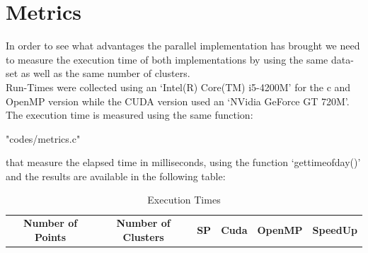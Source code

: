 \documentclass[10pt,twocolumn,letterpaper]{article}
\begin{document}
\section{Metrics}
In order to see what advantages the parallel implementation has brought we need to measure the execution time of both 
implementations by using the same data-set as well as the same number of clusters.\\
Run-Times were collected using an `Intel(R) Core(TM) i5-4200M' for the c and OpenMP version while the CUDA version used an
`NVidia GeForce GT 720M'.\\
The execution time is measured using the same function:\\
\begin{lstinputlisting}[language=C,style=CSnippetStyle,caption=Time Function,firstline=1,lastline=13]{
	"codes/metrics.c"}
\end{lstinputlisting}
that measure the elapsed time in milliseconds, using the function `gettimeofday()' and the results are available in the following table:
\\
\begin{table}[H]
\centering
\begin{tabular}{@{}cccccc@{}}
\textbf{Number of Points} & \textbf{Number of Clusters} & \textbf{SP} & \textbf{Cuda} & \textbf{OpenMP} &  \textbf{SpeedUp} \\
\end{tabular}
\caption{Execution Times}

\end{table}
\end{document}
